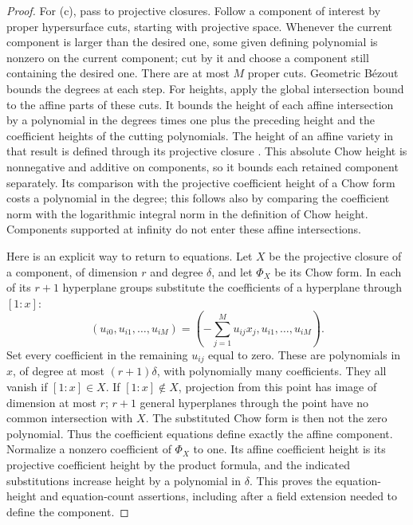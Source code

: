 \begin{proof}
For \textup{(c)}, pass to projective closures.  Follow a component of
interest by proper hypersurface cuts, starting with projective space.
Whenever the current component is larger than the desired one, some
given defining polynomial is nonzero on the current component; cut by
it and choose a component still containing the desired one.  There are
at most $M$ proper cuts.  Geometric B\'ezout bounds the degrees at each
step.  For heights, apply the global intersection bound
\cite[Corollary~2.11]{KrickPardoSombra2001} to the affine parts of these
cuts.  It bounds the height of each affine intersection by a polynomial
in the degrees times one plus the preceding height and the coefficient
heights of the cutting polynomials.  The height of an affine variety
in that result is defined through its projective closure
\cite[\S1.2.4]{KrickPardoSombra2001}.  This absolute Chow height is
nonnegative and additive on components, so it bounds each retained
component separately.  Its comparison with the projective coefficient
height of a Chow form costs a polynomial
in the degree; this follows also by comparing the coefficient norm with
the logarithmic integral norm in the definition of Chow height.
Components supported at infinity do not enter these affine intersections.

Here is an explicit way to return to equations.  Let $X$ be the projective
closure of a component, of dimension $r$ and degree $\delta$, and let
$\Phi_X$ be its Chow form.  In each of its $r+1$ hyperplane groups
substitute the coefficients of a hyperplane through $[1:x]$:
\[
 (u_{i0},u_{i1},\ldots,u_{iM})
   =\left(-\sum_{j=1}^M u_{ij}x_j,u_{i1},\ldots,u_{iM}\right).
\]
Set every coefficient in the remaining $u_{ij}$ equal to zero.  These
are polynomials in $x$, of degree at most $(r+1)\delta$, with
polynomially many coefficients.  They all vanish if $[1:x]\in X$.
If $[1:x]\notin X$, projection from this point has image of dimension
at most $r$; $r+1$ general hyperplanes through the point have no common
intersection with $X$.  The substituted Chow form is then not the zero
polynomial.  Thus the coefficient equations define exactly the affine
component.  Normalize a nonzero coefficient of $\Phi_X$ to one.
Its affine coefficient height is its projective coefficient height by
the product formula, and the indicated substitutions increase height
by a polynomial in $\delta$.  This proves the equation-height and
equation-count assertions, including after a field extension needed to
define the component.
\end{proof}


